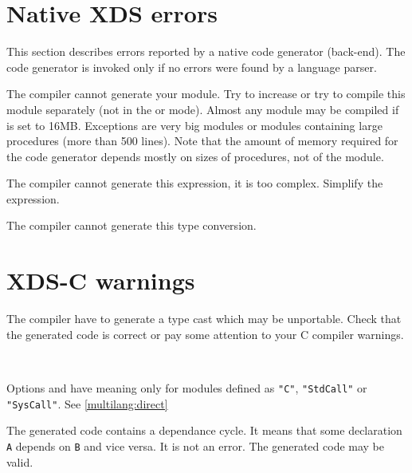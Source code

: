 \ifgencode
\section{Native XDS errors}

This section describes errors reported by a native code generator
(back-end).  The code generator is invoked only if no errors were found
by a language parser.


The compiler cannot generate your module. Try to increase  or
try to compile this module separately (not in the
 or  mode).
Almost any module may be compiled if  is set to 16MB.
Exceptions are very big modules or modules containing large procedures
(more than 500 lines).
Note that the amount of memory required for the code generator depends mostly on
sizes of procedures, not of the module.


The compiler cannot generate this expression, it is too complex.
Simplify the expression.


The compiler cannot generate this type conversion.

\section{XDS-C warnings}


The compiler have to generate a type cast which may be unportable.
Check that the generated code is correct or pay some attention to
your C compiler warnings.

 \ifonline\else\\\fi
{}

Options  and  have meaning only for modules defined as
\verb'"C"', \verb'"StdCall"' or \verb'"SysCall"'. See \ref{multilang:direct}


The generated code contains a dependance cycle. It means that some
declaration \verb'A' depends on \verb'B' and vice versa. It is not an error. The
generated code may be valid.
\fi %

